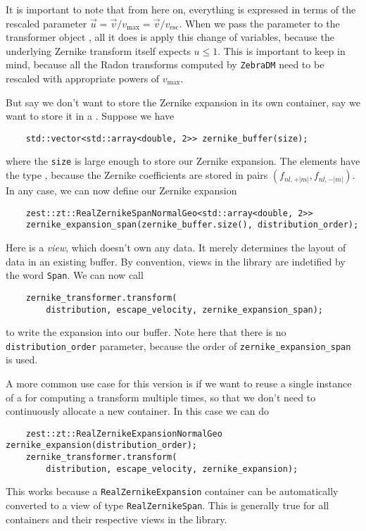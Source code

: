 \documentclass{article}
\begin{document}
It is important to note that from here on, everything is expressed in terms of the rescaled parameter $\vec{u}=\vec{v}/v_\text{max}=\vec{v}/v_\text{esc}$. When we pass the parameter  to the transformer object , all it does is apply this change of variables, because the underlying Zernike transform itself expects $u\leq1$. This is important to keep in mind, because all the Radon transforms computed by \texttt{ZebraDM} need to be rescaled with appropriate powers of $v_\text{max}$.

But say we don't want to store the Zernike expansion in its own container, say we want to store it in a . Suppose we have 
\begin{verbatim}
    std::vector<std::array<double, 2>> zernike_buffer(size);
\end{verbatim}
where the \texttt{size} is large enough to store our Zernike expansion. The elements have the type , because the Zernike coefficients are stored in pairs $(f_{nl,+|m|},f_{nl,-|m|})$. In any case, we can now define our Zernike expansion
\begin{verbatim}
    zest::zt::RealZernikeSpanNormalGeo<std::array<double, 2>>
    zernike_expansion_span(zernike_buffer.size(), distribution_order);
\end{verbatim}
Here  is a \emph{view}, which doesn't own any data. It merely determines the layout of data in an existing buffer. By convention, views in the library are indetified by the word \texttt{Span}. We can now call
\begin{verbatim}
    zernike_transformer.transform(
        distribution, escape_velocity, zernike_expansion_span);
\end{verbatim}
to write the expansion into our buffer. Note here that there is no \texttt{distribution\_order} parameter, because the order of \texttt{zernike\_expansion\_span} is used.

A more common use case for this version is if we want to reuse a single instance of a  for computing a transform multiple times, so that we don't need to continuously allocate a new container. In this case we can do
\begin{verbatim}
    zest::zt::RealZernikeExpansionNormalGeo zernike_expansion(distribution_order);
    zernike_transformer.transform(
        distribution, escape_velocity, zernike_expansion);
\end{verbatim}
This works because a \texttt{RealZernikeExpansion} container can be automatically converted to a view of type \texttt{RealZernikeSpan}. This is generally true for all containers and their respective views in the library.
\end{document}
